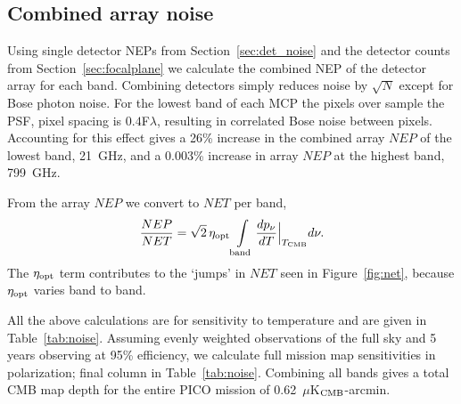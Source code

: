 \documentclass[]{spie}  %
\begin{document}
\subsection{Combined  array noise}

Using single detector NEPs from Section~\ref{sec:det_noise} and the detector counts from Section~\ref{sec:focalplane} we 
calculate the combined NEP of the detector array for each band.  Combining detectors simply reduces noise by $\sqrt{N}$ 
except for Bose photon noise. For the lowest band of each MCP the pixels over sample the PSF, pixel spacing is $0.4$F$\lambda$, resulting in correlated 
Bose noise between pixels.  Accounting for this effect gives a 26\% increase in the combined array $NEP$ of the lowest band, 21~GHz, and  
a 0.003\% increase in array $NEP$ at the highest band, 799~GHz.  

From the array $NEP$ we convert to $NET$ per band,
\begin{equation}
\label{eq:NET}
\frac{NEP}{NET} = \sqrt{2} \, \eta_{\rm opt} \int\limits_{\rm band}\frac{dp_{\nu}}{dT}\Bigr|_{T_{\rm CMB}} d\nu.
\end{equation} 
The $\eta_{\rm opt}$ term contributes to the `jumps' in $NET$ seen in Figure~\ref{fig:net}, because $\eta_{\rm opt}$ varies band to band.  

All the above calculations are for sensitivity to temperature and are given in Table~\ref{tab:noise}.  Assuming evenly weighted observations 
of the full sky and 5 years observing at 95\% efficiency, we calculate full mission map sensitivities in polarization; final column in Table~\ref{tab:noise}.
Combining all bands gives a total CMB map depth for the entire PICO mission of 0.62~$\mu$K$_{\rm CMB}$-arcmin.
\end{document}
